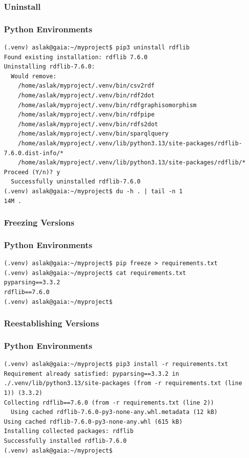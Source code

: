 {\subsubsection{Uninstall}
\begin{frame}[fragile]
  \frametitle{Python Environments  }
  \vspace{3mm}
    \begin{verbatim}
(.venv) aslak@gaia:~/myproject$ pip3 uninstall rdflib
Found existing installation: rdflib 7.6.0
Uninstalling rdflib-7.6.0:
  Would remove:
    /home/aslak/myproject/.venv/bin/csv2rdf
    /home/aslak/myproject/.venv/bin/rdf2dot
    /home/aslak/myproject/.venv/bin/rdfgraphisomorphism
    /home/aslak/myproject/.venv/bin/rdfpipe
    /home/aslak/myproject/.venv/bin/rdfs2dot
    /home/aslak/myproject/.venv/bin/sparqlquery
    /home/aslak/myproject/.venv/lib/python3.13/site-packages/rdflib-7.6.0.dist-info/*
    /home/aslak/myproject/.venv/lib/python3.13/site-packages/rdflib/*
Proceed (Y/n)? y
  Successfully uninstalled rdflib-7.6.0
(.venv) aslak@gaia:~/myproject$ du -h . | tail -n 1
14M	.
  \end{verbatim}
\end{frame}

\subsubsection{Freezing Versions}
\begin{frame}[fragile]
  \frametitle{Python Environments  }
  \vspace{3mm}
    \begin{verbatim}
(.venv) aslak@gaia:~/myproject$ pip freeze > requirements.txt
(.venv) aslak@gaia:~/myproject$ cat requirements.txt
pyparsing==3.3.2
rdflib==7.6.0
(.venv) aslak@gaia:~/myproject$
  \end{verbatim}
\end{frame}

\subsubsection{Reestablishing Versions}
\begin{frame}[fragile]
  \frametitle{Python Environments  }
  \vspace{3mm}
    \begin{verbatim}
(.venv) aslak@gaia:~/myproject$ pip3 install -r requirements.txt
Requirement already satisfied: pyparsing==3.3.2 in ./.venv/lib/python3.13/site-packages (from -r requirements.txt (line 1)) (3.3.2)
Collecting rdflib==7.6.0 (from -r requirements.txt (line 2))
  Using cached rdflib-7.6.0-py3-none-any.whl.metadata (12 kB)
Using cached rdflib-7.6.0-py3-none-any.whl (615 kB)
Installing collected packages: rdflib
Successfully installed rdflib-7.6.0
(.venv) aslak@gaia:~/myproject$
  \end{verbatim}
\end{frame}

}
